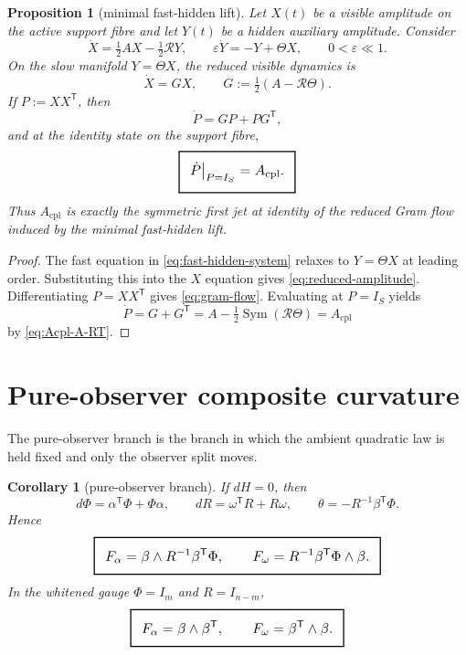 \documentclass[11pt,a4paper]{article}
\numberwithin{equation}{section}
\DeclareMathOperator{\Sym}{Sym}
\newcommand{\geomboxed}[1]{%
  \setlength{\fboxsep}{8pt}%
  \setlength{\fboxrule}{0.9pt}%
  \fbox{\scalebox{1.10}{$\displaystyle #1$}}%
}
\theoremstyle{thmcompact}
\newtheorem{proposition}[theorem]{Proposition}
\newtheorem{corollary}[theorem]{Corollary}
\theoremstyle{remark}
\begin{document}
\begin{proposition}[minimal fast-hidden lift]\label{prop:fast-hidden-lift}
Let $X(t)$ be a visible amplitude on the active support fibre and let $Y(t)$ be a hidden auxiliary amplitude. Consider
\begin{equation}
\dot X=\tfrac12AX-\tfrac12\mathcal RY,
\qquad
\varepsilon\dot Y=-Y+\Theta X,
\qquad 0<\varepsilon\ll1.
\label{eq:fast-hidden-system}
\end{equation}
On the slow manifold $Y=\Theta X$, the reduced visible dynamics is
\begin{equation}
\dot X=GX,
\qquad
G:=\tfrac12(A-\mathcal R\Theta).
\label{eq:reduced-amplitude}
\end{equation}
If $P:=XX^{\mathsf T}$, then
\begin{equation}
\dot P=GP+PG^{\mathsf T},
\label{eq:gram-flow}
\end{equation}
and at the identity state on the support fibre,
\begin{equation}
\geomboxed{\dot P\big|_{P=I_S}=A_{\mathrm{cpl}}.}
\label{eq:gram-first-jet}
\end{equation}
Thus $A_{\mathrm{cpl}}$ is exactly the symmetric first jet at identity of the reduced Gram flow induced by the minimal fast-hidden lift.
\end{proposition}

\begin{proof}
The fast equation in \eqref{eq:fast-hidden-system} relaxes to $Y=\Theta X$ at leading order. Substituting this into the $X$ equation gives \eqref{eq:reduced-amplitude}. Differentiating $P=XX^{\mathsf T}$ gives \eqref{eq:gram-flow}. Evaluating at $P=I_S$ yields
\[
\dot P=G+G^{\mathsf T}=A-\tfrac12\Sym(\mathcal R\Theta)=A_{\mathrm{cpl}}
\]
by \eqref{eq:Acpl-A-RT}.
\end{proof}

\section{Pure-observer composite curvature}

The pure-observer branch is the branch in which the ambient quadratic law is held fixed and only the observer split moves.

\begin{corollary}[pure-observer branch]\label{cor:pure-observer-branch}
If $dH=0$, then
\begin{equation}
d\Phi=\alpha^{\mathsf T}\Phi+\Phi\alpha,
\qquad
dR=\omega^{\mathsf T}R+R\omega,
\qquad
\theta=-R^{-1}\beta^{\mathsf T}\Phi.
\label{eq:pure-observer-branch}
\end{equation}
Hence
\begin{equation}
\geomboxed{F_{\alpha}=\beta\wedge R^{-1}\beta^{\mathsf T}\Phi,
\qquad
F_{\omega}=R^{-1}\beta^{\mathsf T}\Phi\wedge\beta.}
\label{eq:pure-observer-curvature}
\end{equation}
In the whitened gauge $\Phi=I_m$ and $R=I_{n-m}$,
\begin{equation}
\geomboxed{F_{\alpha}=\beta\wedge\beta^{\mathsf T},
\qquad
F_{\omega}=\beta^{\mathsf T}\wedge\beta.}
\label{eq:whitened-curvature}
\end{equation}
\end{corollary}
\end{document}
